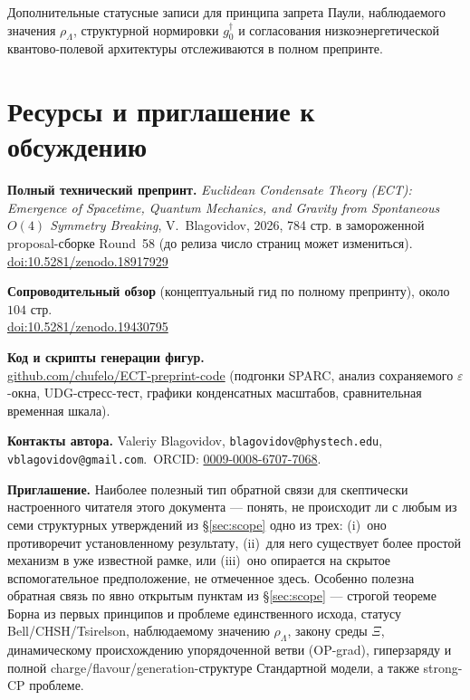 \documentclass[11pt,a4paper]{article}
\begin{document}
Дополнительные статусные записи для принципа запрета Паули,
наблюдаемого значения $\rho_\Lambda$, структурной нормировки
$g^\dagger_0$ и согласования низкоэнергетической квантово-полевой
архитектуры отслеживаются в полном препринте.

\section{Ресурсы и приглашение к обсуждению}
\label{sec:resources}

\textbf{Полный технический препринт.}
\emph{Euclidean Condensate Theory (ECT): Emergence of Spacetime,
Quantum Mechanics, and Gravity from Spontaneous $O(4)$ Symmetry
Breaking}, V.~Blagovidov, 2026, 784 стр. в замороженной proposal-сборке Round~58 (до релиза число страниц может измениться).\\
\href{https://doi.org/10.5281/zenodo.18917929}{doi:10.5281/zenodo.18917929}

\textbf{Сопроводительный обзор}
(концептуальный гид по полному препринту), около $104$ стр.\\
\href{https://doi.org/10.5281/zenodo.19430795}{doi:10.5281/zenodo.19430795}

\textbf{Код и скрипты генерации фигур.}\\
\href{https://github.com/chufelo/ECT-preprint-code}{github.com/chufelo/ECT-preprint-code}
(подгонки SPARC, анализ сохраняемого $\varepsilon$-окна,
UDG-стресс-тест, графики конденсатных масштабов, сравнительная
временная шкала).

\textbf{Контакты автора.}
Valeriy Blagovidov,
\texttt{blagovidov@phystech.edu},
\texttt{vblagovidov@gmail.com}.\,
ORCID:
\href{https://orcid.org/0009-0008-6707-7068}{0009-0008-6707-7068}.

\textbf{Приглашение.}
Наиболее полезный тип обратной связи для скептически настроенного
читателя этого документа — понять, не происходит ли с любым из
семи структурных утверждений из \S\ref{sec:scope} одно из трех:
(i)~оно противоречит установленному результату,
(ii)~для него существует более простой механизм в уже известной
рамке, или (iii)~оно опирается на скрытое вспомогательное
предположение, не отмеченное здесь.
Особенно полезна обратная связь по явно открытым пунктам из
\S\ref{sec:scope} — строгой теореме Борна из первых принципов и
проблеме единственного исхода, статусу Bell/CHSH/Tsirelson,
наблюдаемому значению $\rho_\Lambda$, закону среды $\Xi$,
динамическому происхождению упорядоченной ветви (OP-grad),
гиперзаряду и полной charge/flavour/generation-структуре
Стандартной модели, а также strong-CP проблеме.



\end{document}
